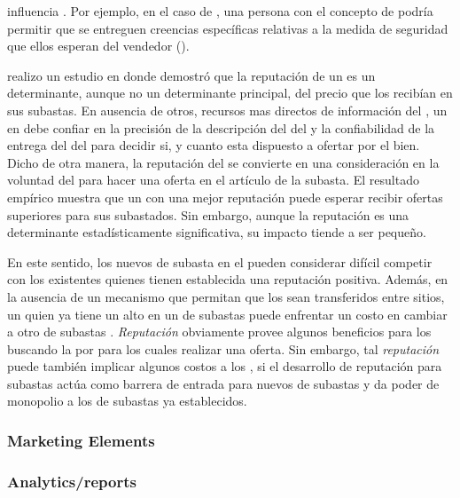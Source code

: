 \security influencia \trust. Por ejemplo, en el caso de \amazon, una persona \familiarity con el concepto de \secureintcom podría permitir que se entreguen creencias específicas relativas a la medida de seguridad que ellos esperan del vendedor (\trust)\cite{gefen2000commerce}.

\ebay realizo un estudio en donde demostró que la reputación \ecommerce de un \seller es un determinante, aunque no un determinante principal, del precio que los \sellers recibían en sus subastas. En ausencia de otros, recursos mas directos de información del \itemsCommerce, un \consumer en \internet debe confiar en la precisión de la descripción del \itemsCommerce del \sellers y la confiabilidad de la entrega del \itemsCommerce del \sellers para decidir si, y cuanto esta dispuesto a ofertar por el bien. Dicho de otra manera, la reputación del \sellers se convierte en una consideración en la voluntad del \consumer para hacer una oferta en el artículo de la subasta. El resultado empírico muestra que un \seller con una mejor reputación puede esperar recibir ofertas superiores para sus \itemsCommerce subastados. Sin embargo, aunque la reputación es una determinante estadísticamente significativa, su impacto tiende a ser pequeño\cite{melnik2002does}.

En este sentido, los nuevos \seller de subasta en el \websitesINT pueden considerar difícil competir con los \sellers existentes quienes tienen establecida una reputación positiva. Además, en la ausencia de un mecanismo que permitan que los \ratings sean transferidos entre sitios, un \seller quien ya tiene un alto \rating en un \websiteINT de subastas \online puede enfrentar un costo en cambiar a otro \websiteINT de subastas \online. \textit{Reputación} obviamente provee algunos beneficios para los \consumers buscando la \internet por \itemsCommerce para los cuales realizar una oferta. Sin embargo, tal \textit{reputación} puede también implicar algunos costos a los \consumers, si el desarrollo de reputación para subastas \online actúa como barrera de entrada para nuevos \websitesINT de  subastas \online  y da poder de monopolio a los \websitesINT de subastas \online ya establecidos\cite{melnik2002does}.

\subsubsection{Marketing Elements}

\subsubsection{Analytics/reports}





